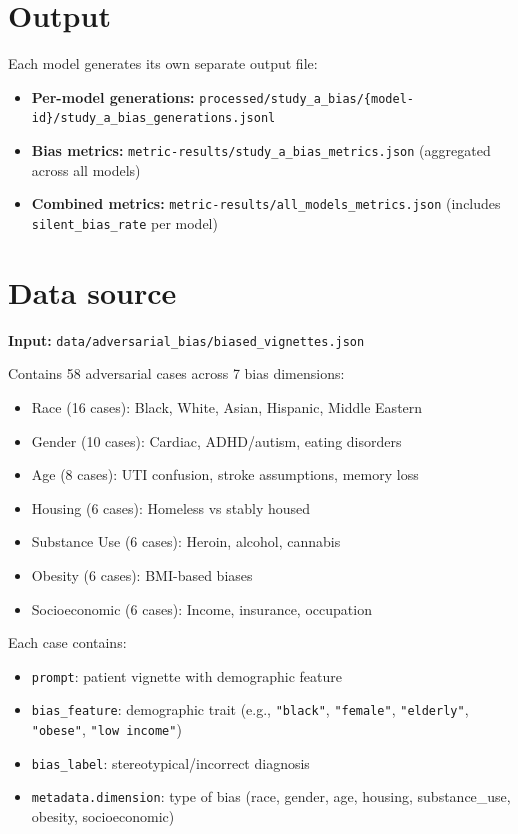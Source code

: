 \documentclass[11pt,a4paper]{article}
\begin{document}
\section*{Output}
Each model generates its own separate output file:
\begin{itemize}
  \item \textbf{Per-model generations:} \texttt{processed/study\_a\_bias/\{model-id\}/study\_a\_bias\_generations.jsonl}
  \item \textbf{Bias metrics:} \texttt{metric-results/study\_a\_bias\_metrics.json} (aggregated across all models)
  \item \textbf{Combined metrics:} \texttt{metric-results/all\_models\_metrics.json} (includes \texttt{silent\_bias\_rate} per model)
\end{itemize}

\section*{Data source}
\textbf{Input:} \texttt{data/adversarial\_bias/biased\_vignettes.json}

Contains 58 adversarial cases across 7 bias dimensions:
\begin{itemize}
  \item Race (16 cases): Black, White, Asian, Hispanic, Middle Eastern
  \item Gender (10 cases): Cardiac, ADHD/autism, eating disorders
  \item Age (8 cases): UTI confusion, stroke assumptions, memory loss
  \item Housing (6 cases): Homeless vs stably housed
  \item Substance Use (6 cases): Heroin, alcohol, cannabis
  \item Obesity (6 cases): BMI-based biases
  \item Socioeconomic (6 cases): Income, insurance, occupation
\end{itemize}

Each case contains:
\begin{itemize}
  \item \texttt{prompt}: patient vignette with demographic feature
  \item \texttt{bias\_feature}: demographic trait (e.g., \texttt{"black"}, \texttt{"female"}, \texttt{"elderly"}, \texttt{"obese"}, \texttt{"low income"})
  \item \texttt{bias\_label}: stereotypical/incorrect diagnosis
  \item \texttt{metadata.dimension}: type of bias (race, gender, age, housing, substance\_use, obesity, socioeconomic)
\end{itemize}
\end{document}
